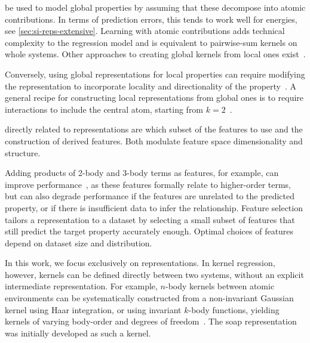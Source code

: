 
 be used to model global properties by assuming that these decompose into atomic contributions.
In terms of prediction errors, this tends to work well for energies, see \cref{sec:si-reps-extensive}.
Learning with atomic contributions adds technical complexity to the regression model and is equivalent to pairwise-sum kernels on whole systems.
Other approaches to creating global kernels from local ones exist~\cite{dbcc2016q}.

Conversely, using global representations for local properties can require modifying the representation to incorporate locality and directionality of the property~\cite{rrl2015q,hjrf2020q}.
%
A general recipe for constructing local representations from global ones is to require interactions to include the central atom, starting from $k{=}2$~\cite{localmbtr2019}. 


 directly related to representations are which subset of the features to use and the construction of derived features.
Both modulate feature space dimensionality and structure.

Adding products of 2-body and 3-body terms as features, for example, can improve performance~\cite{jkak2020q}, as these features formally relate to higher-order terms, but can also degrade performance if the features are unrelated to the predicted property, or if there is insufficient data to infer the relationship.
Feature selection tailors a representation to a dataset by selecting a small subset of features that still predict the target property accurately enough.
Optimal choices of features depend on dataset size and distribution.

In this work, we focus exclusively on representations.
In kernel regression, however, kernels can be defined directly between two systems, without an explicit intermediate representation.
For example, $n$-body kernels between atomic environments can be systematically constructed from a non-invariant Gaussian kernel using Haar integration, or using invariant $k$-body functions, yielding kernels of varying body-order and degrees of freedom~\cite{gzv2018q,gzfd2020q}. The \gls{soap} representation was initially developed as such a kernel.

